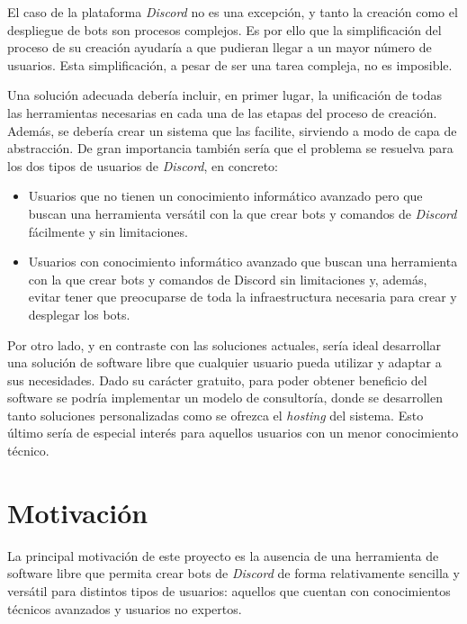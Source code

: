 El caso de la plataforma \textit{Discord} no es una excepción, y tanto la creación como el despliegue de bots son procesos complejos. Es por ello que la simplificación del proceso de su creación ayudaría a que pudieran llegar a un mayor número de usuarios. Esta simplificación, a pesar de ser una tarea compleja, no es imposible.

Una solución adecuada debería incluir, en primer lugar, la unificación de todas las herramientas necesarias en cada una de las etapas del proceso de creación. Además, se debería crear un sistema que las facilite, sirviendo a modo de capa de abstracción. De gran importancia también sería que el problema se resuelva para los dos tipos de usuarios de \textit{Discord}, en concreto:

\begin{itemize}
	\item Usuarios que no tienen un conocimiento informático avanzado pero que buscan una herramienta versátil con la que crear bots y comandos de \textit{Discord} fácilmente y sin limitaciones.
	\item Usuarios con conocimiento informático avanzado que buscan una herramienta con la que crear bots y comandos de Discord sin limitaciones y, además, evitar tener que preocuparse de toda la infraestructura necesaria para crear y desplegar los bots.
\end{itemize}

Por otro lado, y en contraste con las soluciones actuales, sería ideal desarrollar una solución de software libre que cualquier usuario pueda utilizar y adaptar a sus necesidades. Dado su carácter gratuito, para poder obtener beneficio del software se podría implementar un modelo de consultoría, donde se desarrollen tanto soluciones personalizadas como se ofrezca el \textit{hosting} del sistema. Esto último sería de especial interés para aquellos usuarios con un menor conocimiento técnico.



\section{Motivación}

La principal motivación de este proyecto es la ausencia de una herramienta de software libre que permita crear bots de \textit{Discord} de forma relativamente sencilla y versátil para distintos tipos de usuarios: aquellos que cuentan con conocimientos técnicos avanzados y usuarios no expertos.

